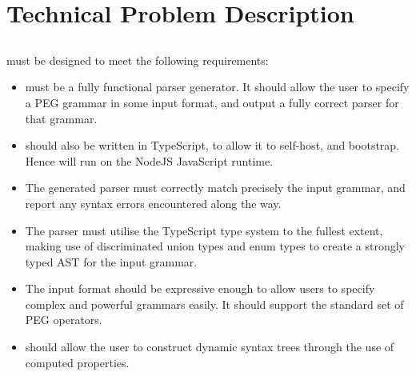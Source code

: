 \chapter{Technical Problem Description}
\section{\tsPEG{}}
\tsPEG{} must be designed to meet the following requirements:

 \begin{itemize}
     \item \tsPEG{} must be a fully functional parser generator. It should allow the user to specify a PEG grammar in some input format, and output a fully correct parser for that grammar.
 
     \item \tsPEG{} should also be written in TypeScript, to allow it to self-host, and bootstrap. Hence \tsPEG{} will run on the NodeJS JavaScript runtime.
 
     \item The generated parser must correctly match precisely the input grammar, and report any syntax errors encountered along the way.
 
     \item The parser must utilise the TypeScript type system to the fullest extent, making use of discriminated union types and enum types to create a strongly typed AST for the input grammar.
 
     \item The \tsPEG{} input format should be expressive enough to allow users to specify complex and powerful grammars easily. It should support the standard set of PEG operators.

     \item \tsPEG{} should allow the user to construct dynamic syntax trees through the use of computed properties.
 \end{itemize}

\section{\Setanta{}}

